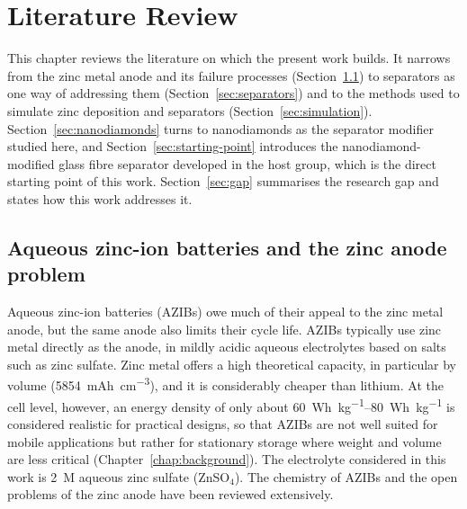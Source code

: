 
\chapter{Literature Review}
\label{chap:review}


This chapter reviews the literature on which the present work builds.
It narrows from the zinc metal anode and its failure processes (Section~\ref{sec:zn-anode}) to separators as one way of addressing them (Section~\ref{sec:separators}) and to the methods used to simulate zinc deposition and separators (Section~\ref{sec:simulation}).
Section~\ref{sec:nanodiamonds} turns to nanodiamonds as the separator modifier studied here, and Section~\ref{sec:starting-point} introduces the nanodiamond-modified glass fibre separator developed in the host group, which is the direct starting point of this work.
Section~\ref{sec:gap} summarises the research gap and states how this work addresses it.

\section{Aqueous zinc-ion batteries and the zinc anode problem}
\label{sec:zn-anode}

Aqueous zinc-ion batteries (AZIBs) owe much of their appeal to the zinc metal anode, but the same anode also limits their cycle life.
AZIBs typically use zinc metal directly as the anode, in mildly acidic aqueous electrolytes based on salts such as zinc sulfate\cite{rana_electroanalytical_2025}.
Zinc metal offers a high theoretical capacity, in particular by volume (\SI{5854}{mAh.cm^{-3}})\cite{dong_towards_2022}, and it is considerably cheaper than lithium\cite{cui_revealing_2025}.
At the cell level, however, an energy density of only about \SIrange[range-units=single]{60}{80}{Wh.kg^{-1}} is considered realistic for practical designs\cite{dong_towards_2022}, so that AZIBs are not well suited for mobile applications but rather for stationary storage where weight and volume are less critical (Chapter~\ref{chap:background}).
The electrolyte considered in this work is \SI{2}{M} aqueous zinc sulfate (ZnSO$_4$).
The chemistry of AZIBs and the open problems of the zinc anode have been reviewed extensively\cite{blanc_scientific_2020,tang_issues_2019,yu_ten_2023}.

